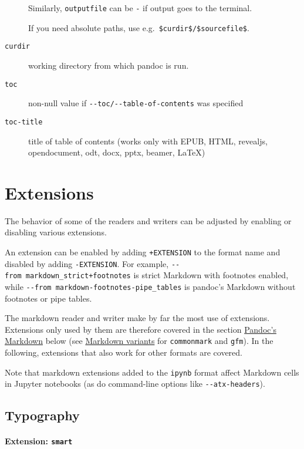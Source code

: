 \documentclass[
]{article}
\begin{document}
\begin{description}
Similarly, \texttt{outputfile} can be \texttt{-} if output goes to the
terminal.

If you need absolute paths, use e.g.~\texttt{\$curdir\$/\$sourcefile\$}.
\item[\texttt{curdir}]
working directory from which pandoc is run.
\item[\texttt{toc}]
non-null value if \texttt{-\/-toc/-\/-table-of-contents} was specified
\item[\texttt{toc-title}]
title of table of contents (works only with EPUB, HTML, revealjs,
opendocument, odt, docx, pptx, beamer, LaTeX)
\end{description}

\hypertarget{extensions}{%
\section{Extensions}\label{extensions}}

The behavior of some of the readers and writers can be adjusted by
enabling or disabling various extensions.

An extension can be enabled by adding \texttt{+EXTENSION} to the format
name and disabled by adding \texttt{-EXTENSION}. For example,
\texttt{-\/-from\ markdown\_strict+footnotes} is strict Markdown with
footnotes enabled, while
\texttt{-\/-from\ markdown-footnotes-pipe\_tables} is pandoc's Markdown
without footnotes or pipe tables.

The markdown reader and writer make by far the most use of extensions.
Extensions only used by them are therefore covered in the section
\protect\hyperlink{pandocs-markdown}{Pandoc's Markdown} below (see
\protect\hyperlink{markdown-variants}{Markdown variants} for
\texttt{commonmark} and \texttt{gfm}). In the following, extensions that
also work for other formats are covered.

Note that markdown extensions added to the \texttt{ipynb} format affect
Markdown cells in Jupyter notebooks (as do command-line options like
\texttt{-\/-atx-headers}).

\hypertarget{typography}{%
\subsection{Typography}\label{typography}}

\hypertarget{extension-smart}{%
\paragraph{\texorpdfstring{Extension:
\texttt{smart}}{Extension: smart}}\label{extension-smart}}
\end{document}
